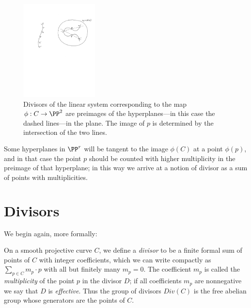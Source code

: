 \begin{figure}
 \caption{Divisors of the linear system corresponding to the map $\phi:C \to \PP^2$ are preimages of the hyperplanes---in this case the dashed lines---in the plane.
 The image of $p$ is determined by the intersection of the two lines.}
\centerline {\includegraphics[height=2in]{"Fig1.1.pdf"}}
\end{figure}

Some hyperplanes in $\PP^{r}$ will be tangent to the image $\phi(C)$ at a point $\phi(p)$, and in that case the point $p$ should be counted with higher multiplicity in the preimage of that hyperplane; in
this way we arrive at a notion of divisor as a sum of points with multiplicities.



\section{Divisors}

We  begin again, more formally:

On a smooth projective curve $C$, we define a \emph{divisor} to be a finite formal sum of points of $C$ with integer coefficients, which we can write compactly as $\sum_{p\in C} m_p\cdot p$ with all but finitely many $m_p=0$.  The coefficient $m_p$ is called the \emph{multiplicity} of the point $p$ in the divisor $D$; if all coefficients $m_p$ are nonnegative we say that $D$ is \emph{effective}. Thus the group of divisors $Div(C)$ is the free abelian group whose generators
are the points of $C$.

